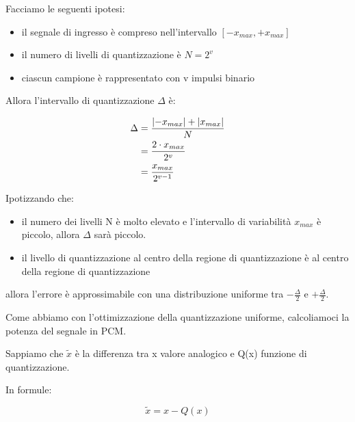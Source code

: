 Facciamo le seguenti ipotesi: 

\begin{itemize}
    \item il segnale di ingresso è compreso nell'intervallo $[- x_{max}, + x_{max}]$
    \item il numero di livelli di quantizzazione è $N = 2^{v}$
    \item ciascun campione è rappresentato con v impulsi binario
\end{itemize}

Allora l'intervallo di quantizzazione $\Delta$ è:

{
    \Large 
    \begin{equation}
        \begin{split}
            \Delta 
            &= 
            \frac{\abs{- x_{max}} + \abs{x_{max}}}{N}
            \\
            &=
            \frac{2 \cdot x_{max}}{2^{v}}
            \\
            &= 
            \frac{x_{max}}{2^{v-1}}
        \end{split}
    \end{equation}
}

Ipotizzando che: 
\begin{itemize}
    \item il numero dei livelli N è molto elevato e l'intervallo di variabilità $x_{max}$ è piccolo, allora $\Delta$ sarà piccolo. \newline 
    \item il livello di quantizzazione al centro della regione di quantizzazione è al centro della regione di quantizzazione
\end{itemize}

allora l'errore è approssimabile con una distribuzione uniforme tra $-\frac{\Delta}{2}$ e $+\frac{\Delta}{2}$. \newline 

Come abbiamo con l'ottimizzazione della quantizzazione uniforme, 
calcoliamoci la potenza del segnale in PCM. \newline 

Sappiamo che $\tilde{x}$ è la differenza tra x valore analogico e Q(x) funzione di quantizzazione. \newline 

In formule: 

{
    \Large 
    \begin{equation}
        \tilde{x} = x - Q(x)
    \end{equation}
}

